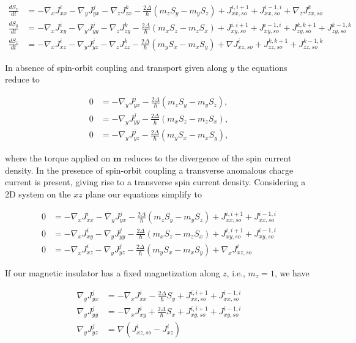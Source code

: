 \documentclass[10pt,prb,showpacs,amssymb,floatfix]{revtex4-1}
\newcommand{\Dlt}{\Delta}
\begin{document}
\begin{align}
\frac{d S_x}{dt} &= -\nabla_x J^{i}_{xx}  - \nabla_y J^{j}_{yx}   - \nabla_z J^{k}_{zx}  -\frac{2\Dlt}{\hbar} (m_z S_y - m_y S_z ) + J_{xx,so}^{i,i+1} + J_{xx,so}^{i-1,i} + \nabla_z J_{zx,so}^{k} \\
\frac{d S_y}{dt} &= -\nabla_x J^{i}_{xy}  -\nabla_y J^{j}_{yy}   -\nabla_z J^{k}_{zy}  -\frac{2\Dlt}{\hbar} (m_x  S_z   - m_z  S_x) + J_{xy,so}^{i,i+1} + J_{xy,so}^{i-1,i} + J_{zy,so}^{k,k+1} +   J_{zy,so}^{k-1,k} \\
\frac{d S_z}{dt} &= -\nabla_x J^{i}_{xz}  -\nabla_y J^{j}_{yz} -\nabla_z J^{k}_{zz}  -\frac{2\Dlt}{\hbar} (m_y  S_x - m_x  S_y) + \nabla J_{xz,so}^i + J_{zz,so}^{k,k+1} + J_{zz,so}^{k-1,k}
\end{align}

In absence of spin-orbit coupling and transport given along $y$ the equations reduce to

\begin{align}
0 &=  - \nabla_y J^{j}_{yx}    -\frac{2\Dlt}{\hbar} (m_z S_y - m_y S_z ),  \\
0 &=   -\nabla_y J^{j}_{yy}     -\frac{2\Dlt}{\hbar} (m_x  S_z   - m_z  S_x),  \\
0 &=  -\nabla_y J^{j}_{yz}   -\frac{2\Dlt}{\hbar} (m_y  S_x - m_x  S_y), 
\end{align}

where the torque applied on $\bm m$ reduces to the divergence of the spin current density. In the presence of spin-orbit coupling a transverse anomalous charge current is present, giving rise to a transverse spin current density. Considering a 2D system on the $xz$ plane our equations simplify to

\begin{align}
0 &= -\nabla_x J^{i}_{xx}  - \nabla_y J^{j}_{yx}    -\frac{2\Dlt}{\hbar} (m_z S_y - m_y S_z ) + J_{xx,so}^{i,i+1} + J_{xx,so}^{i-1,i} \\
0 &= -\nabla_x J^{i}_{xy}  -\nabla_y J^{j}_{yy}    -\frac{2\Dlt}{\hbar} (m_x  S_z   - m_z  S_x) + J_{xy,so}^{i,i+1} + J_{xy,so}^{i-1,i}  \\
0 &= -\nabla_x J^{i}_{xz}  -\nabla_y J^{j}_{yz}   -\frac{2\Dlt}{\hbar} (m_y  S_x - m_x  S_y) + \nabla_x J_{xz,so}^i 
\end{align}

If our magnetic insulator has a fixed magnetization along $z$, i.e., $m_z=1$, we have

\begin{align}
\nabla_y J^{j}_{yx}   &= -\nabla_x J^{i}_{xx}    -\frac{2\Dlt}{\hbar} S_y  + J_{xx,so}^{i,i+1} + J_{xx,so}^{i-1,i} \\
\nabla_y J^{j}_{yy}   &= -\nabla_x J^{i}_{xy}   + \frac{2\Dlt}{\hbar} S_x + J_{xy,so}^{i,i+1} + J_{xy,so}^{i-1,i}  \\
\nabla_y J^{j}_{yz}  &=      \nabla (J_{xz,so}^i - J^{i}_{xz})
\end{align}
\end{document}
